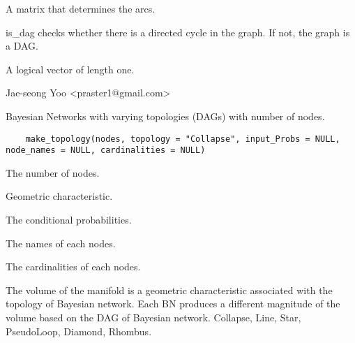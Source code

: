 \documentclass[a4paper]{book}
\begin{document}
%
\begin{Arguments}
\begin{ldescription}
\item[\code{arcs\_mat}]  A matrix that determines the arcs. 
\end{ldescription}
\end{Arguments}
%
\begin{Details}\relax
is\_dag checks whether there is a directed cycle in the graph. If not, the graph is a DAG.
\end{Details}
%
\begin{Value}
A logical vector of length one.
\end{Value}
%
\begin{Author}\relax
 Jae-seong Yoo <praster1@gmail.com> 
\end{Author}
%
\begin{SeeAlso}\relax
{}
\end{SeeAlso}
%
\begin{Description}\relax
Bayesian Networks with varying topologies (DAGs) with number of nodes.
\end{Description}
%
\begin{Usage}
\begin{verbatim}
	make_topology(nodes, topology = "Collapse", input_Probs = NULL, node_names = NULL, cardinalities = NULL)
\end{verbatim}
\end{Usage}
%
\begin{Arguments}
\begin{ldescription}
\item[\code{nodes}]  The number of nodes. 
\item[\code{topology}]  Geometric characteristic. 
\item[\code{input\_Probs}]  The conditional probabilities. 
\item[\code{node\_names}]  The names of each nodes. 
\item[\code{cardinalities}]  The cardinalities of each nodes. 
\end{ldescription}
\end{Arguments}
%
\begin{Details}\relax
The volume of the manifold is a geometric characteristic associated with the topology of Bayesian network. Each BN produces a different magnitude of the volume based on the DAG of Bayesian network.
Collapse, Line, Star, PseudoLoop, Diamond, Rhombus.
\end{Details}
\end{document}
